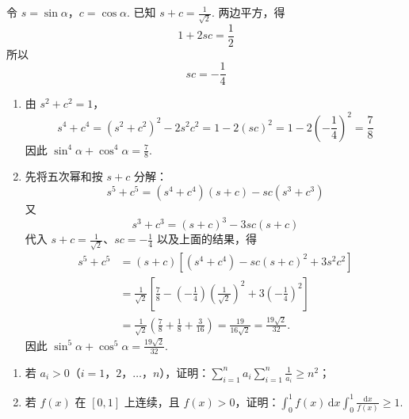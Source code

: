\begin{solution}
令 \(s=\sin\alpha\)，\(c=\cos\alpha\). 已知 \(s+c=\frac{1}{\sqrt{2}}\). 两边平方，得
\[
1+2sc=\frac{1}{2}
\]
所以
\[
sc=-\frac{1}{4}
\]

\begin{enumerate}
\item 由 \(s^{2}+c^{2}=1\)，
\[
s^{4}+c^{4}=\left(s^{2}+c^{2}\right)^{2}-2s^{2}c^{2}
 =1-2\left(sc\right)^{2}
 =1-2\left(-\frac{1}{4}\right)^{2}
 =\frac{7}{8}
\]
因此 \(\sin^{4}\alpha+\cos^{4}\alpha=\frac{7}{8}\).

\item 先将五次幂和按 \(s+c\) 分解：
\[
s^{5}+c^{5}=(s^{4}+c^{4})(s+c)-sc(s^{3}+c^{3})
\]
又
\[
s^{3}+c^{3}=(s+c)^{3}-3sc(s+c)
\]
代入 \(s+c=\frac{1}{\sqrt{2}}\)、\(sc=-\frac{1}{4}\) 以及上面的结果，得
\[
\begin{aligned}
s^{5}+c^{5}&=(s+c)\left[(s^{4}+c^{4})-sc(s+c)^{2}+3s^{2}c^{2}\right]\\
&=\frac{1}{\sqrt{2}}\left[\frac{7}{8}-\left(-\frac{1}{4}\right)\left(\frac{1}{\sqrt{2}}\right)^{2}+3\left(-\frac{1}{4}\right)^{2}\right]\\
&=\frac{1}{\sqrt{2}}\left(\frac{7}{8}+\frac{1}{8}+\frac{3}{16}\right)=\frac{19}{16\sqrt{2}}=\frac{19\sqrt{2}}{32}.
\end{aligned}
\]
因此 \(\sin^{5}\alpha+\cos^{5}\alpha=\frac{19\sqrt{2}}{32}\).
\end{enumerate}
\end{solution}

\begin{problem}
\begin{enumerate}
\item 若 \(a_i>0\)（\(i=1\)，\(2\)，\(\dots\)，\(n\)），证明：\(\displaystyle\sum_{i=1}^{n}a_i\sum_{i=1}^{n}\frac{1}{a_i}\geqslant n^{2}\)；
\item 若 \(f(x)\) 在 \([0,1]\) 上连续，且 \(f(x)>0\)，证明：\(\displaystyle\int_{0}^{1}f(x)\,\mathrm{d}x\int_{0}^{1}\frac{\mathrm{d}x}{f(x)}\geqslant1\).
\end{enumerate}
\end{problem}

